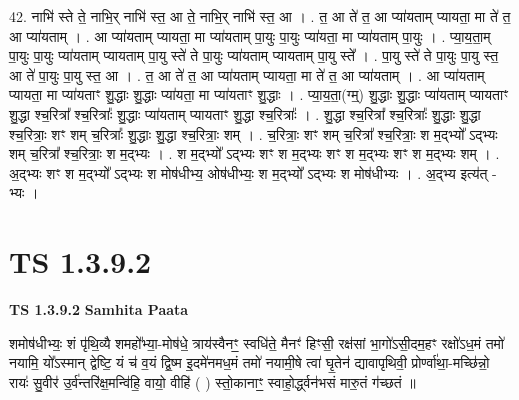 \documentclass[17pt]{extarticle}
\begin{document}
42. नाभि॑ स्ते ते॒ नाभि॒र् नाभि॑ स्त॒ आ ते॒ नाभि॒र् नाभि॑ स्त॒ आ । . त॒ आ ते॑ त॒ आ प्या॑यताम् प्यायता॒ मा ते॑ त॒ आ प्या॑यताम् । . आ प्या॑यताम् प्यायता॒ मा प्या॑यताम् पा॒युः पा॒युः प्या॑यता॒ मा प्या॑यताम् पा॒युः । . प्या॒य॒ता॒म् पा॒युः पा॒युः प्या॑यताम् प्यायताम् पा॒यु स्ते॑ ते पा॒युः प्या॑यताम् प्यायताम् पा॒यु स्ते᳚ । . पा॒यु स्ते॑ ते पा॒युः पा॒यु स्त॒ आ ते॑ पा॒युः पा॒यु स्त॒ आ । . त॒ आ ते॑ त॒ आ प्या॑यताम् प्यायता॒ मा ते॑ त॒ आ प्या॑यताम् । . आ प्या॑यताम् प्यायता॒ मा प्या॑यताꣳ शु॒द्धाः शु॒द्धाः प्या॑यता॒ मा प्या॑यताꣳ शु॒द्धाः । . प्या॒य॒ता॒(ग्म्॒) शु॒द्धाः शु॒द्धाः प्या॑यताम् प्यायताꣳ शु॒द्धा श्च॒रित्रा᳚ श्च॒रित्राः᳚ शु॒द्धाः प्या॑यताम् प्यायताꣳ शु॒द्धा श्च॒रित्राः᳚ । . शु॒द्धा श्च॒रित्रा᳚ श्च॒रित्राः᳚ शु॒द्धाः शु॒द्धा श्च॒रित्राः॒ शꣳ शम् च॒रित्राः᳚ शु॒द्धाः शु॒द्धा श्च॒रित्राः॒ शम् । . च॒रित्राः॒ शꣳ शम् च॒रित्रा᳚ श्च॒रित्राः॒ श म॒द्भ्यो᳚ ऽद्भ्यः शम् च॒रित्रा᳚ श्च॒रित्राः॒ श म॒द्भ्यः । . श म॒द्भ्यो᳚ ऽद्भ्यः शꣳ श म॒द्भ्यः शꣳ श म॒द्भ्यः शꣳ श म॒द्भ्यः शम् । . अ॒द्भ्यः शꣳ श म॒द्भ्यो᳚ ऽद्भ्यः श मोष॑धीभ्य॒ ओष॑धीभ्यः॒ श म॒द्भ्यो᳚ ऽद्भ्यः श मोष॑धीभ्यः । . अ॒द्भ्य इत्य॑त् - भ्यः । \newline
\pagebreak
{}

\section{ TS 1.3.9.2 }

\textbf{TS 1.3.9.2 } \newline
\textbf{Samhita Paata} \newline

शमोष॑धीभ्यः॒ शं पृ॑थि॒व्यै शमहो᳚भ्या॒-मोष॑धे॒ त्राय॑स्वैनꣳ॒॒ स्वधि॑ते॒ मैनꣳ॑ हिꣳसी॒ रक्ष॑सां भा॒गो॑ऽसी॒दम॒हꣳ रक्षो॑ऽध॒मं तमो॑ नयामि॒ यो᳚ऽस्मान् द्वेष्टि॒ यं च॑ व॒यं द्वि॒ष्म इ॒दमे॑नमध॒मं तमो॑ नयामी॒षे त्वा॑ घृ॒तेन॑ द्यावापृथिवी॒ प्रोर्ण्वा॑था॒-मच्छि॑न्नो॒ रायः॑ सु॒वीर॑ उ॒र्व॑न्तरि॑क्ष॒मन्वि॑हि॒ वायो॒ वीहि॑ ( ) स्तो॒कानाꣳ॒॒ स्वाहो॒र्द्ध्वन॑भसं मारु॒तं ग॑च्छतं ॥ \newline
\end{document}
